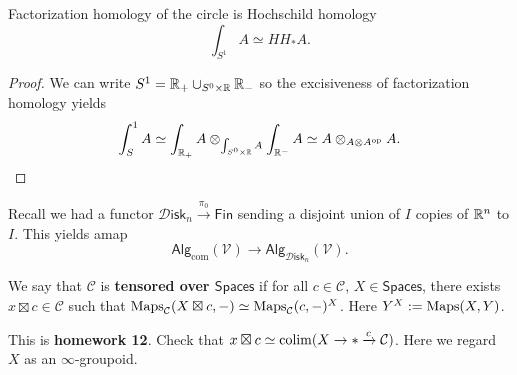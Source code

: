 \documentclass{amsart}
\begin{document}
\begin{corollary}
    Factorization homology of the circle is Hochschild homology
    \begin{equation*}
        \int_{S^1} A \simeq HH_*A.
    \end{equation*}
\end{corollary}
\begin{proof}
    We can write $S^1=\mathbb{R}_+\cup_{S^0\times\mathbb{R}}\mathbb{R}_-$ so the excisiveness of factorization homology yields
    \begin{equation*}
        \int_S^1 A\simeq \int_{\mathbb{R}_+}A \otimes_{\int_{S^0\times\mathbb{R}}A}\int_{\mathbb{R}^-}A \simeq A\otimes_{A\otimes A^\text{op}}A.
    \end{equation*}
\end{proof}

\begin{example}
    Recall we had a functor $\mathcal{D}\mathsf{isk}_n\xrightarrow{\pi_0} \mathsf{Fin}$ sending
    a disjoint union of $I$ copies of $\mathbb{R}^n$ to $I$. This yields amap
    \begin{equation*}
        \mathsf{Alg}_\text{com}(\mathcal{V}) \to \mathsf{Alg}_{\mathcal{D}\mathsf{isk}_n}(\mathcal{V}).
    \end{equation*}
\end{example}

\begin{definition}
    We say that $\mathcal{C}$ is \textbf{tensored over $\mathsf{Spaces}$} if for all
    $c\in \mathcal{C}$, $X\in\mathsf{Spaces}$, there exists $x\boxtimes c\in\mathcal{C}$
    such that $\operatorname{Maps}_\mathcal{C}(X\boxtimes c,-)\simeq \operatorname{Maps}_{\mathcal{C}}(c,-)^X$.
    Here $Y^X:=\operatorname{Maps}(X,Y)$.
\end{definition}

\begin{exercise}
    This is \textbf{homework 12}. Check that $x\boxtimes c\simeq \operatorname*{colim}(X\to *\xrightarrow{c} \mathcal{C})$.
    Here we regard $X$ as an $\infty$-groupoid.
\end{exercise}
\end{document}
